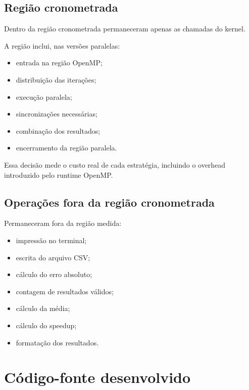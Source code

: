 \subsection{Região cronometrada}

Dentro da região cronometrada permaneceram apenas as chamadas do kernel.

A região inclui, nas versões paralelas:

\begin{itemize}
    \item entrada na região OpenMP;
    \item distribuição das iterações;
    \item execução paralela;
    \item sincronizações necessárias;
    \item combinação dos resultados;
    \item encerramento da região paralela.
\end{itemize}

Essa decisão mede o custo real de cada estratégia, incluindo o overhead
introduzido pelo runtime OpenMP.


\subsection{Operações fora da região cronometrada}

Permaneceram fora da região medida:

\begin{itemize}
    \item impressão no terminal;
    \item escrita do arquivo CSV;
    \item cálculo do erro absoluto;
    \item contagem de resultados válidos;
    \item cálculo da média;
    \item cálculo do speedup;
    \item formatação dos resultados.
\end{itemize}


\section{Código-fonte desenvolvido}

\label{sec:atvd06-codigo}




